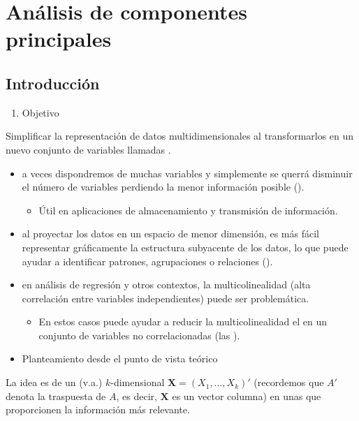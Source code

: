 \section{Análisis de componentes principales}
\subsection{Introducción}
\begin{enumerate}[label=\arabic*)]
	\item Objetivo
\end{enumerate}
Simplificar la representación de datos multidimensionales al transformarlos en un nuevo conjunto de variables llamadas .
\begin{itemize}
	\item {} a veces dispondremos de muchas variables y simplemente se querrá disminuir el número de variables perdiendo la menor información posible ().
	\begin{itemize}
		\item Útil en aplicaciones de almacenamiento y transmisión de información.
	\end{itemize}
	\item {} al proyectar los datos en un espacio de menor dimensión, es más fácil representar gráficamente la estructura subyacente de los datos, lo que puede ayudar a identificar patrones, agrupaciones o relaciones ().
	\item {} en análisis de regresión y otros contextos, la multicolinealidad (alta correlación entre variables independientes) puede ser problemática.
	\begin{itemize}
		\item En estos casos puede ayudar a reducir la multicolinealidad el  en un conjunto de variables no correlacionadas (las ).
	\end{itemize}
\end{itemize}
\begin{itemize}[label=\color{red}\textbullet, leftmargin=*]
	\item \color{lightblue}Planteamiento desde el punto de vista teórico
\end{itemize}
La idea es  de un \vea (v.a.) $k$-dimensional $\mathbf{X}=(X_1,\dots,X_k)'$ (recordemos que $A'$ denota la traspuesta de $A$, es decir, $\mathbf{X}$ es un vector columna) en unas  que proporcionen la información más relevante.

